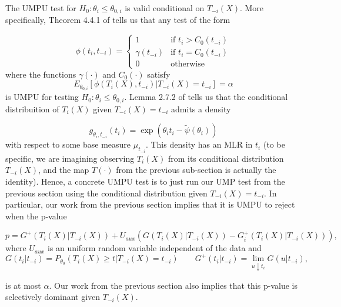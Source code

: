 \documentclass{article}
\begin{document}
\begin{appendix}
The UMPU test for $H_0: \theta_i \leq \theta_{0, i}$ is valid conditional on $T_{-i}(X)$. More specifically, Theorem 4.4.1 of \cite{Lehmann} tells us that any test of the form 

\begin{equation*}
    \label{eq:exp_fam_test}
    \phi(t_i, t_{-i}) = \begin{cases}
        1 &\text{if } t_i > C_0(t_{-i})  \\
        \gamma(t_{-i}) &\text{if } t_i = C_0(t_{-i})   \\
        0 & \text{otherwise }
    \end{cases}
\end{equation*}
where the functions $\gamma(\cdot)$ and $C_0(\cdot)$ satisfy 
\begin{equation*}
    E_{\theta_{0, i}}[\phi(T_i(X), t_{-i}) | T_{-i}(X) = t_{-i}] = \alpha
\end{equation*}
is UMPU for testing $H_0: \theta_i \leq \theta_{0, i}$. Lemma 2.7.2 of \cite{Lehmann} tells us that the conditional distribuition of $T_{i}(X)$ given $T_{-i}(X) = t_{-i}$ admits a density 

\begin{equation*}
    g_{\theta_i, t_{-i}}(t_i) = \exp(\theta_i t_i - \tilde{\psi}(\theta_i))  
\end{equation*}
with respect to some base measure $\mu_{t_{-i}}$. This density has an MLR in $t_i$ (to be specific, we are imagining observing $T_i(X)$ from its conditional distribution $T_{-i}(X)$, and the map $T(\cdot)$ from the previous sub-section is actually the identity). Hence, a concrete UMPU test is to just run our UMP test from the previous section using the conditional distribution given $T_{-i}(X) = t_{-i}$. In particular, our work from the previous section implies that it is UMPU to reject when the p-value

\begin{equation}
    \label{eq:ump_exp_fam}
    p = G^{+}(T_i(X)|T_{-i}(X)) + U_{aux}(G(T_i(X)|T_{-i}(X)) - G^{+}_i(T_i(X)|T_{-i}(X))),
\end{equation}
where $U_{aux}$ is an uniform random variable independent of the data and 
\begin{equation*}
    G(t_i | t_{-i}) = P_{\theta_0}(T_i(X) \geq t | T_{-i}(X) = t_{-i}) \qquad G^{+}(t_i | t_{-i}) = \lim_{u \downarrow t_i} G(u| t_{-i}),
\end{equation*}

is at most $\alpha$. Our work from the previous section also implies that this p-value is selectively dominant given $T_{-i}(X)$. 


\end{appendix}
\end{document}
